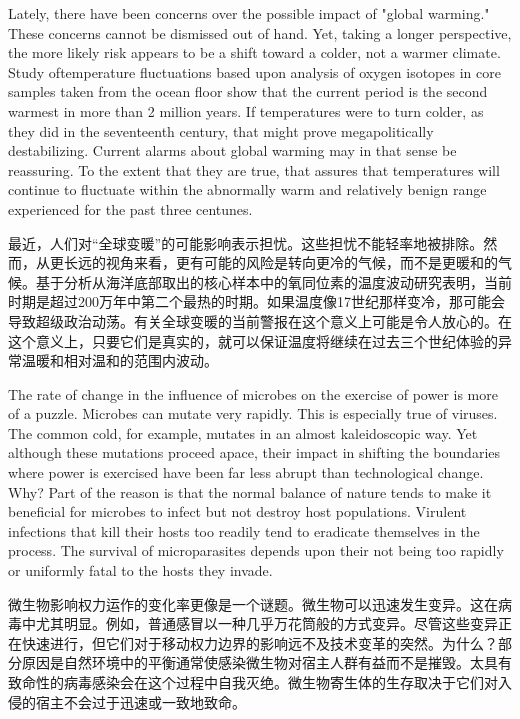 \begin{Parallel}{97mm}{72mm}
  \ParallelLText
  {Lately, there have been concerns over the possible impact of "global warming." These concerns cannot be dismissed out of hand. Yet, taking a longer perspective, the more likely risk appears to be a shift toward a colder, not a warmer climate. Study oftemperature fluctuations based upon analysis of oxygen isotopes in core samples taken from the ocean floor show that the current period is the second warmest in more than 2 million years. If temperatures were to turn colder, as they did in the seventeenth century, that might prove megapolitically destabilizing. Current alarms about global warming may in that sense be reassuring. To the extent that they are true, that assures that temperatures will continue to fluctuate within the abnormally warm and relatively benign range experienced for the past three centunes.}
  
  \ParallelRText
  {最近，人们对“全球变暖”的可能影响表示担忧。这些担忧不能轻率地被排除。然而，从更长远的视角来看，更有可能的风险是转向更冷的气候，而不是更暖和的气候。基于分析从海洋底部取出的核心样本中的氧同位素的温度波动研究表明，当前时期是超过200万年中第二个最热的时期。如果温度像17世纪那样变冷，那可能会导致超级政治动荡。有关全球变暖的当前警报在这个意义上可能是令人放心的。在这个意义上，只要它们是真实的，就可以保证温度将继续在过去三个世纪体验的异常温暖和相对温和的范围内波动。}
  \ParallelPar



  \ParallelLText
  {The rate of change in the influence of microbes on the exercise of power is more of a puzzle. Microbes can mutate very rapidly. This is especially true of viruses. The common cold, for example, mutates in an almost kaleidoscopic way. Yet although these mutations proceed apace, their impact in shifting the boundaries where power is exercised have been far less abrupt than technological change. Why? Part of the reason is that the normal balance of nature tends to make it beneficial for microbes to infect but not destroy host populations. Virulent infections that kill their hosts too readily tend to eradicate themselves in the process. The survival of microparasites depends upon their not being too rapidly or uniformly fatal to the hosts they invade.}
  
  \ParallelRText
  {微生物影响权力运作的变化率更像是一个谜题。微生物可以迅速发生变异。这在病毒中尤其明显。例如，普通感冒以一种几乎万花筒般的方式变异。尽管这些变异正在快速进行，但它们对于移动权力边界的影响远不及技术变革的突然。为什么？部分原因是自然环境中的平衡通常使感染微生物对宿主人群有益而不是摧毁。太具有致命性的病毒感染会在这个过程中自我灭绝。微生物寄生体的生存取决于它们对入侵的宿主不会过于迅速或一致地致命。}
  \ParallelPar




\end{Parallel}

